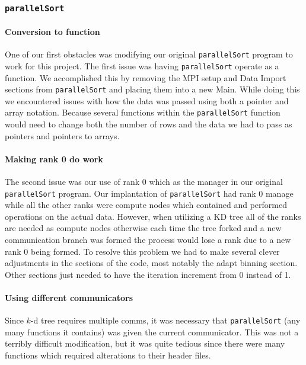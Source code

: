 \documentclass{article}
\begin{document}
\subsubsection{\texttt{parallelSort}}


\paragraph{Conversion to function}
One of our first obstacles was modifying our original \texttt{parallelSort}  program to work for this project. The first issue was having \texttt{parallelSort} operate as a function. We accomplished this by removing the MPI setup and Data Import sections from \texttt{parallelSort} and placing them into a new Main. While doing this we encountered issues with how the data was passed using both a pointer and array notation. Because several functions within the \texttt{parallelSort} function would need to change both the number of rows and the data we had to pass as pointers and pointers to arrays. 


\paragraph{Making rank 0 do work}
The second issue was our use of rank 0 which as the manager in our original \texttt{parallelSort} program. Our implantation of \texttt{parallelSort} had rank 0 manage while all the other ranks were compute nodes which contained and performed operations on the actual data. However, when utilizing a KD tree all of the ranks are needed as compute nodes otherwise each time the tree forked and a new communication branch was formed the process would lose a rank due to a new rank 0 being formed. To resolve this problem we had to make several clever adjustments in the sections of the code, most notably the adapt binning section. Other sections just needed to have the iteration increment from 0 instead of 1.

\paragraph{Using different communicators}
Since $k$-d tree requires multiple comms, it was necessary that \texttt{parallelSort} (any many functions it contains) was given the current communicator. This was not a terribly difficult modification, but it was quite tedious since there were many functions which required alterations to their header files.
\end{document}
